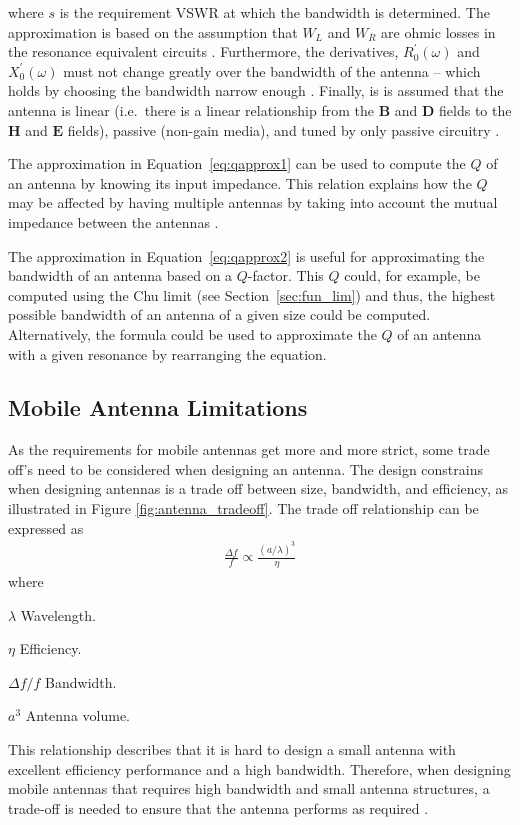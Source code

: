 where $s$ is the requirement VSWR at which the bandwidth is determined. The approximation is based on the assumption that $W_L$ and $W_R$ are ohmic losses in the resonance equivalent circuits \cite{yaghjian2005impedance}. Furthermore, the derivatives, $R^{\prime}_0(\omega)$ and $X^{\prime}_0(\omega)$ must not change greatly over the bandwidth of the antenna -- which holds by choosing the bandwidth narrow enough \cite{yaghjian2005impedance}.
Finally, is is assumed that the antenna is linear (i.e.\ there is a linear relationship from the $\mathbf{B}$ and $\mathbf{D}$ fields to the $\mathbf{H}$ and $\mathbf{E}$ fields), passive (non-gain media), and tuned by only passive circuitry \cite{yaghjian2005impedance}. 

The approximation in Equation~\ref{eq:qapprox1} can be used to compute the $Q$ of an antenna by knowing its input impedance. This relation explains how the $Q$ may be affected by having multiple antennas by taking into account the mutual impedance between the antennas \cite{balanis2012antenna}.

The approximation in Equation~\ref{eq:qapprox2} is useful for approximating the bandwidth of an antenna based on a $Q$-factor. This $Q$ could, for example, be computed using the Chu limit (see Section~\ref{sec:fun_lim}) and thus, the highest possible bandwidth of an antenna of a given size could be computed. Alternatively, the formula could be used to approximate the $Q$ of an antenna with a given resonance by rearranging the equation.

\FloatBarrier
\subsection{Mobile Antenna Limitations}
\label{subsec:ant_limit}
As the requirements for mobile antennas get more and more strict, some trade off's need to be considered when designing an antenna.
The design constrains when designing antennas is a trade off between size, bandwidth, and efficiency, as illustrated in Figure \ref{fig:antenna_tradeoff}. 
The trade off relationship can be expressed as \cite{hilbert2015tradeoff}
\begin{align} %
  \frac{\Delta f}{f} \propto \frac{(a/ \lambda)^3}{\eta}
\end{align}
where
\begin{where}
\item [$\lambda$] Wavelength.
\item [$\eta$] Efficiency.
\item [$\Delta f / f$] Bandwidth.
\item [$a^3$] Antenna volume.
\end{where}
This relationship describes that it is hard to design a small antenna with excellent efficiency performance and a high bandwidth.
Therefore, when designing mobile antennas that requires high bandwidth and small antenna structures, a trade-off is needed to ensure that the antenna performs as required \cite{hilbert2015tradeoff}.

